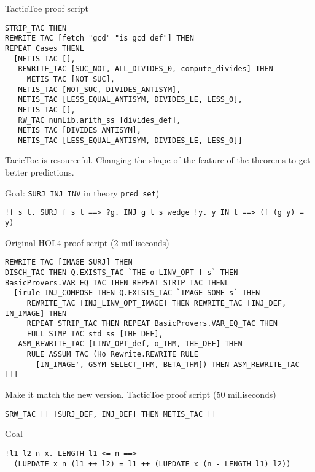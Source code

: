 \documentclass[runningheads,a4paper,draft]{svjour3}
\def\holfour{\textsf{HOL4}\xspace}
\def\tactictoe{\textsf{TacticToe}\xspace}
\begin{document}
\vspace{5mm}

\tactictoe proof script
\begin{lstlisting}[language=SMLSmall,frame=tb]
STRIP_TAC THEN 
REWRITE_TAC [fetch "gcd" "is_gcd_def"] THEN 
REPEAT Cases THENL 
  [METIS_TAC [], 
   REWRITE_TAC [SUC_NOT, ALL_DIVIDES_0, compute_divides] THEN 
     METIS_TAC [NOT_SUC], 
   METIS_TAC [NOT_SUC, DIVIDES_ANTISYM], 
   METIS_TAC [LESS_EQUAL_ANTISYM, DIVIDES_LE, LESS_0], 
   METIS_TAC [], 
   RW_TAC numLib.arith_ss [divides_def], 
   METIS_TAC [DIVIDES_ANTISYM],
   METIS_TAC [LESS_EQUAL_ANTISYM, DIVIDES_LE, LESS_0]]
\end{lstlisting}

TacicToe is resourceful. Changing the shape of the feature of the theorems
to get better predictions.

Goal: \texttt{SURJ\_INJ\_INV} in theory \texttt{pred\_set})
\begin{lstlisting}[language=SMLSmall,frame=tb]
!f s t. SURJ f s t ==> ?g. INJ g t s wedge !y. y IN t ==> (f (g y) = y)
\end{lstlisting}

Original \holfour proof script (2 milliseconds)
\begin{lstlisting}[language=SMLSmall,frame=tb]
REWRITE_TAC [IMAGE_SURJ] THEN
DISCH_TAC THEN Q.EXISTS_TAC `THE o LINV_OPT f s` THEN
BasicProvers.VAR_EQ_TAC THEN REPEAT STRIP_TAC THENL 
  [irule INJ_COMPOSE THEN Q.EXISTS_TAC `IMAGE SOME s` THEN
     REWRITE_TAC [INJ_LINV_OPT_IMAGE] THEN REWRITE_TAC [INJ_DEF, IN_IMAGE] THEN
     REPEAT STRIP_TAC THEN REPEAT BasicProvers.VAR_EQ_TAC THEN
     FULL_SIMP_TAC std_ss [THE_DEF],
   ASM_REWRITE_TAC [LINV_OPT_def, o_THM, THE_DEF] THEN
     RULE_ASSUM_TAC (Ho_Rewrite.REWRITE_RULE
       [IN_IMAGE', GSYM SELECT_THM, BETA_THM]) THEN ASM_REWRITE_TAC []]
\end{lstlisting}

\vspace{5mm}

Make it match the new version.
\tactictoe proof script (50 milliseconds)
\begin{lstlisting}[language=SMLSmall,frame=tb]
SRW_TAC [] [SURJ_DEF, INJ_DEF] THEN METIS_TAC []
\end{lstlisting}


Goal
\begin{lstlisting}[language=SMLSmall,frame=tb]
!l1 l2 n x. LENGTH l1 <= n ==> 
  (LUPDATE x n (l1 ++ l2) = l1 ++ (LUPDATE x (n - LENGTH l1) l2))
\end{lstlisting}
\end{document}
